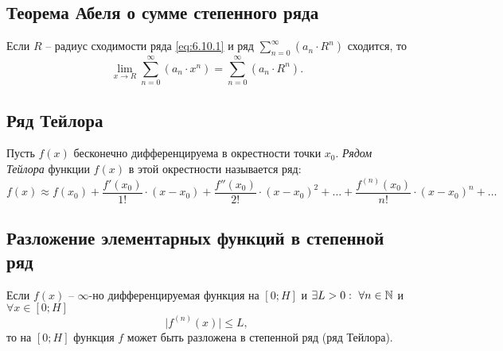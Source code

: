 \newpage

\subsection{Теорема Абеля о сумме степенного ряда}

\begin{theorem}
    Если $R$ -- радиус сходимости ряда \ref{eq:6.10.1} и ряд $\sum_{n=0}^{\infty}(a_n \cdot R^n)$ сходится, то
    \[
        \underset{x\rightarrow R}{\lim}\sum_{n=0}^{\infty}(a_n \cdot x^n) = \sum_{n=0}^{\infty} (a_n \cdot R^n).
    \]
\end{theorem}

\subsection{Ряд Тейлора}

\begin{definition}
    Пусть $f(x)$ бесконечно дифференцируема в окрестности точки $x_0$. \emph{Рядом Тейлора} функции $f(x)$ в этой окрестности называется ряд:
    \[
        f(x)\approx f(x_0) + \frac{f'(x_0)}{1!}\cdot (x-x_0) + \frac{f''(x_0)}{2!}\cdot (x - x_0)^2 + \ldots + \frac{f^{(n)}(x_0)}{n!}\cdot (x-x_0)^n + \ldots
    \]
\end{definition}

\subsection{Разложение элементарных функций в степенной ряд}

\begin{lemma}
    Если $f(x)$ -- $\infty$-но дифференцируемая функция на $[0;H]$ и $\exists L > 0: \ \forall n \in \mathbb{N}$ и $\forall x \in [0;H]$
    \[
        \big|f^{(n)}(x)\big| \leqslant L,
    \]
    то на $[0;H]$ функция $f$ может быть разложена в степенной ряд (ряд Тейлора).
\end{lemma}
